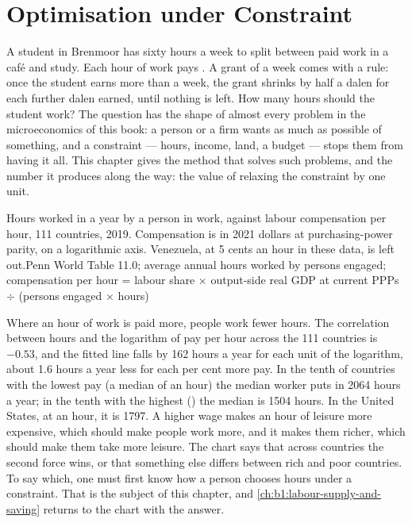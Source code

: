 \chapter{Optimisation under Constraint}\label{ch:b1:constrained-optimisation}

A student in Brenmoor has sixty hours a week to split between paid work in
a café and study. Each hour of work pays . A grant of  a
week comes with a rule: once the student earns more than  a week,
the grant shrinks by half a dalen for each further dalen earned, until
nothing is left. How many hours should the student work? The question has
the shape of almost every problem in the microeconomics of this book: a
person or a firm wants as much as possible of something, and a constraint
--- hours, income, land, a budget --- stops them from having it all. This
chapter gives the method that solves such problems, and the number it
produces along the way: the value of relaxing the constraint by one unit.

\begin{openingchart}{Hours worked in a year by a person in work, against labour
compensation per hour, 111 countries, 2019. Compensation is in 2021 dollars at
purchasing-power parity, on a logarithmic axis. Venezuela, at 5 cents an hour
in these data, is left out.}{Penn World Table 11.0; average annual hours worked
by persons engaged; compensation per hour = labour share $\times$ output-side real
GDP at current PPPs $\div$ (persons engaged $\times$ hours)}
\end{openingchart}

Where an hour of work is paid more, people work fewer hours. The
correlation between hours and the logarithm of pay per hour across the 111
countries is $-0.53$, and the fitted line falls by 162 hours a year for
each unit of the logarithm, about 1.6 hours a year less for each per cent
more pay. %
In the tenth of countries with the lowest pay (a median of  an
hour) the median worker puts in 2064 hours a year; in the tenth with the
highest () the median is 1504 hours. %
In the United States, at  an hour, it is 1797. %
A higher wage makes an hour of leisure more expensive, which should make
people work more, and it makes them richer, which should make them take
more leisure. The chart says that across countries the second force wins,
or that something else differs between rich and poor countries. To say which,
one must first know how a person chooses hours under a constraint. That is
the subject of this chapter, and \cref{ch:b1:labour-supply-and-saving}
returns to the chart with the answer.

